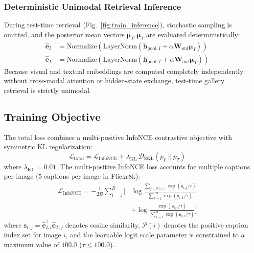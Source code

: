 \documentclass[pdflatex,sn-mathphys-num]{sn-jnl}%
\begin{document}
\subsubsection{Deterministic Unimodal Retrieval Inference}
During test-time retrieval (Fig.~\ref{fig:train_inference}), stochastic sampling is omitted, and the posterior mean vectors $\boldsymbol{\mu}_I, \boldsymbol{\mu}_T$ are evaluated deterministically:
\begin{align}
\hat{\mathbf{e}}_I &= \text{Normalize}\left( \text{LayerNorm}(\mathbf{h}_{\text{pool}, I} + \alpha \mathbf{W}_{\text{out}} \boldsymbol{\mu}_I) \right) \\
\hat{\mathbf{e}}_T &= \text{Normalize}\left( \text{LayerNorm}(\mathbf{h}_{\text{pool}, T} + \alpha \mathbf{W}_{\text{out}} \boldsymbol{\mu}_T) \right)
\end{align}
Because visual and textual embeddings are computed completely independently without cross-modal attention or hidden-state exchange, test-time gallery retrieval is strictly unimodal.

\subsection{Training Objective}
The total loss combines a multi-positive InfoNCE contrastive objective with symmetric KL regularization:
\begin{equation}
\mathcal{L}_{\text{total}} = \mathcal{L}_{\text{InfoNCE}} + \lambda_{\text{KL}} \, \mathcal{D}_{\text{SKL}}(p_I \parallel p_T)
\end{equation}
where $\lambda_{\text{KL}} = 0.01$. The multi-positive InfoNCE loss accounts for multiple captions per image (5 captions per image in Flickr8k):
\begin{align}
\mathcal{L}_{\text{InfoNCE}} = -\frac{1}{2B} \sum_{i=1}^B \Bigg[ &\log \frac{\sum_{j \in \mathcal{P}(i)} \exp(\mathbf{s}_{i,j} / \tau)}{\sum_{k=1}^{5B} \exp(\mathbf{s}_{i,k} / \tau)} \nonumber \\
&+ \log \frac{\exp(\mathbf{s}_{i,i} / \tau)}{\sum_{k=1}^B \exp(\mathbf{s}_{k,i} / \tau)} \Bigg] \label{eq:infonce}
\end{align}
where $\mathbf{s}_{i,j} = \hat{\mathbf{e}}_{I, i}^\top \hat{\mathbf{e}}_{T, j}$ denotes cosine similarity, $\mathcal{P}(i)$ denotes the positive caption index set for image $i$, and the learnable logit scale parameter is constrained to a maximum value of $100.0$ ($\tau \le 100.0$).
\end{document}
